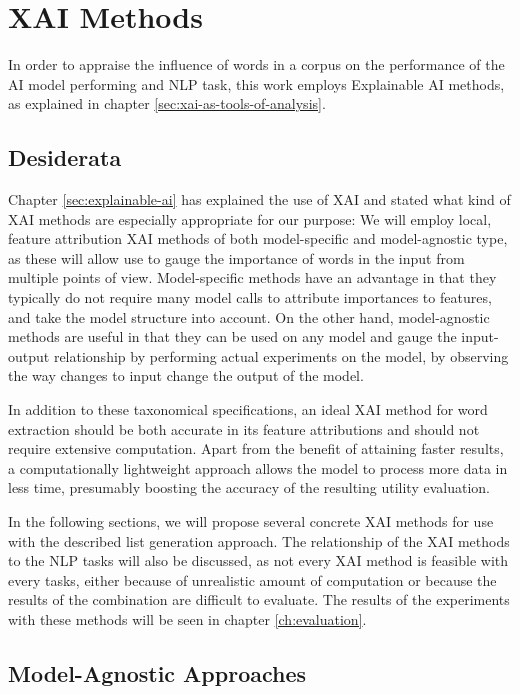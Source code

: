 \section{XAI Methods} \label{sec:xai-methods}
In order to appraise the influence of words in a corpus on the performance of the AI model performing and NLP task, this work employs Explainable AI methods, as explained in chapter \ref{sec:xai-as-tools-of-analysis}.

\subsection{Desiderata}
Chapter \ref{sec:explainable-ai} has explained the use of XAI and stated what kind of XAI methods are especially appropriate for our purpose:
We will employ local, feature attribution XAI methods of both model-specific and model-agnostic type, as these will allow use to gauge the importance of words in the input from multiple points of view.
Model-specific methods have an advantage in that they typically do not require many model calls to attribute importances to features, and take the model structure into account.
On the other hand, model-agnostic methods are useful in that they can be used on any model and gauge the input-output relationship by performing actual experiments on the model, by observing the way changes to input change the output of the model.

In addition to these taxonomical specifications, an ideal XAI method for word extraction should be both accurate in its feature attributions and should not require extensive computation.
Apart from the benefit of attaining faster results, a computationally lightweight approach allows the model to process more data in less time, presumably boosting the accuracy of the resulting utility evaluation.

In the following sections, we will propose several concrete XAI methods for use with the described list generation approach.
The relationship of the XAI methods to the NLP tasks will also be discussed, as not every XAI method is feasible with every tasks, either because of unrealistic amount of computation or because the results of the combination are difficult to evaluate.
The results of the experiments with these methods will be seen in chapter \ref{ch:evaluation}.

\subsection{Model-Agnostic Approaches}

